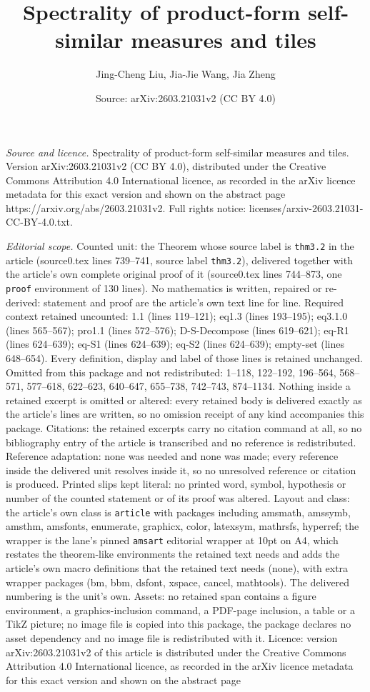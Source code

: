 \documentclass[10pt,a4paper]{amsart}
\title[Spectrality of product-form self-similar measures and tiles]{Spectrality of product-form self-similar measures and tiles}
\author{Jing-Cheng Liu, Jia-Jie Wang, Jia Zheng}
\date{Source: arXiv:2603.21031v2 (CC BY 4.0)}
\begin{document}
\maketitle

\noindent\emph{Source and licence.} Spectrality of product-form self-similar measures and tiles. Version arXiv:2603.21031v2 (CC BY 4.0), distributed under the Creative Commons Attribution 4.0 International licence, as recorded in the arXiv licence metadata for this exact version and shown on the abstract page https://arxiv.org/abs/2603.21031v2. Full rights notice: licenses/arxiv-2603.21031-CC-BY-4.0.txt.\par\smallskip

\noindent\textit{Editorial scope.} Counted unit: the Theorem whose source label is \texttt{thm3.2} in the article (source0.tex lines 739--741, source label \texttt{thm3.2}), delivered together with the article's own complete original proof of it (source0.tex lines 744--873, one \texttt{proof} environment of 130 lines). No mathematics is written, repaired or re-derived: statement and proof are the article's own text line for line. Required context retained uncounted: 1.1 (lines 119--121); eq1.3 (lines 193--195); eq3.1.0 (lines 565--567); pro1.1 (lines 572--576); D-S-Decompose (lines 619--621); eq-R1 (lines 624--639); eq-S1 (lines 624--639); eq-S2 (lines 624--639); empty-set (lines 648--654). Every definition, display and label of those lines is retained unchanged. Omitted from this package and not redistributed: 1--118, 122--192, 196--564, 568--571, 577--618, 622--623, 640--647, 655--738, 742--743, 874--1134. Nothing inside a retained excerpt is omitted or altered: every retained body is delivered exactly as the article's lines are written, so no omission receipt of any kind accompanies this package. Citations: the retained excerpts carry no citation command at all, so no bibliography entry of the article is transcribed and no reference is redistributed. Reference adaptation: none was needed and none was made; every reference inside the delivered unit resolves inside it, so no unresolved reference or citation is produced. Printed slips kept literal: no printed word, symbol, hypothesis or number of the counted statement or of its proof was altered. Layout and class: the article's own class is \texttt{article} with packages including amsmath, amssymb, amsthm, amsfonts, enumerate, graphicx, color, latexsym, mathrsfs, hyperref; the wrapper is the lane's pinned \texttt{amsart} editorial wrapper at 10pt on A4, which restates the theorem-like environments the retained text needs and adds the article's own macro definitions that the retained text needs (none), with extra wrapper packages (bm, bbm, dsfont, xspace, cancel, mathtools). The delivered numbering is the unit's own. Assets: no retained span contains a figure environment, a graphics-inclusion command, a PDF-page inclusion, a table or a TikZ picture; no image file is copied into this package, the package declares no asset dependency and no image file is redistributed with it. Licence: version arXiv:2603.21031v2 of this article is distributed under the Creative Commons Attribution 4.0 International licence, as recorded in the arXiv licence metadata for this exact version and shown on the abstract page 
\end{document}
